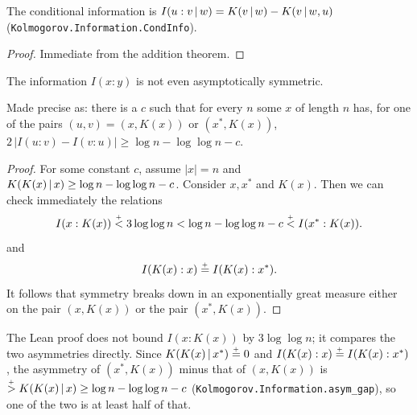 \begin{formalization}
The conditional information is
\( I(u : v \,\vert\, w) = K(v \,\vert\, w) - K(v \,\vert\, w, u) \)
(\texttt{Kolmogorov.Information.CondInfo}).
\end{formalization}

 \begin{proof}
  \leanok
Immediate from the addition theorem.
 \end{proof}

 \begin{theorem}[Levin]
  \label{thm:g3.1.6}
  \leanok
The information \( I(x : y) \) is not even asymptotically symmetric.
 \end{theorem}

\begin{formalization}
Made precise as: there is a \( c \) such that for every \( n \) some \( x \) of length \( n \)
has, for one of the pairs \( (u, v) = (x, K(x)) \) or \( (x^{*}, K(x)) \),
\( 2\,|I(u : v) - I(v : u)| \ge \log n - \log\log n - c \).
\end{formalization}

 \begin{proof}
  \leanok
For some constant \( c \), assume
\( |x| = n \) and \( K(K(x) \,\vert\, x) \ge \log n - \log\log n - c \).
Consider \( x, x^{*} \) and \( K(x) \).
Then we can check immediately the relations
 \[
  I(x : K(x)) \stackrel{{}_+}{<} 3 \log \log n 
              < \log n - \log\log n - c \stackrel{{}_+}{<} I(x^{*} : K(x)).
 \]
and
 \[
    I(K(x) : x) \stackrel{{}_+}{=} I(K(x) : x^{*}).
 \]
It follows that symmetry breaks down in an exponentially great measure
either on the pair \( (x, K(x)) \) or the pair \( (x^{*}, K(x)) \).
 \end{proof}

\begin{formalization}
The Lean proof does not bound \( I(x : K(x)) \) by \( 3 \log\log n \); it compares the two
asymmetries directly. Since \( K(K(x) \,\vert\, x^{*}) \stackrel{{}_+}{=} 0 \) and
\( I(K(x) : x) \stackrel{{}_+}{=} I(K(x) : x^{*}) \), the asymmetry of \( (x^{*}, K(x)) \) minus that of
\( (x, K(x)) \) is \( \stackrel{{}_+}{>} K(K(x) \,\vert\, x) \ge \log n - \log\log n - c \)
(\texttt{Kolmogorov.Information.asym\_gap}), so one of the two is at least half of that.
\end{formalization}


